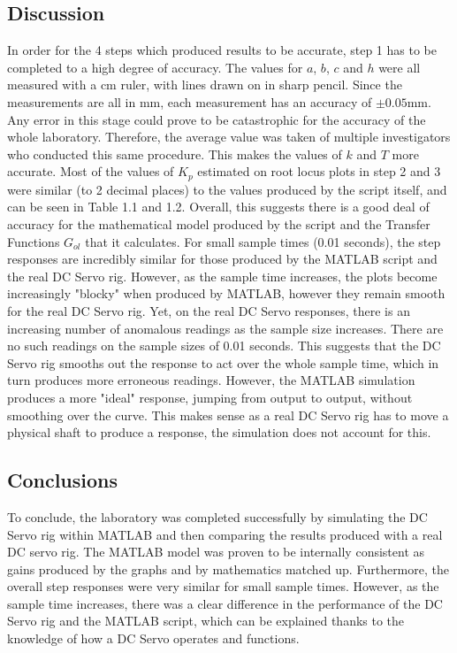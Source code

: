 \documentclass[stu, a4paper, 12pt, floatsintext]{apa7}
\numberwithin{figure}{section}
\numberwithin{table}{section}
\numberwithin{equation}{section}
\begin{document}
\subsection{Discussion}
In order for the 4 steps which produced results to be accurate, step 1 has to be completed to a high degree of accuracy. The values for $a$, $b$, $c$ and $h$ were all measured with a cm ruler, with lines drawn on in sharp pencil. Since the measurements are all in mm, each measurement has an accuracy of $\pm 0.05$mm. Any error in this stage could prove to be catastrophic for the accuracy of the whole laboratory. Therefore, the average value was taken of multiple investigators who conducted this same procedure. This makes the values of $k$ and $T$ more accurate. 
Most of the values of $K_p$ estimated on root locus plots in step 2 and 3 were similar (to 2 decimal places) to the values produced by the script itself, and can be seen in Table 1.1 and 1.2. Overall, this suggests there is a good deal of accuracy for the mathematical model produced by the script and the Transfer Functions $G_{ol}$ that it calculates.
For small sample times (0.01 seconds), the step responses are incredibly similar for those produced by the MATLAB script and the real DC Servo rig. However, as the sample time increases, the plots become increasingly "blocky" when produced by MATLAB, however they remain smooth for the real DC Servo rig. Yet, on the real DC Servo responses, there is an increasing number of anomalous readings as the sample size increases. There are no such readings on the sample sizes of 0.01 seconds. This suggests that the DC Servo rig smooths out the response to act over the whole sample time, which in turn produces more erroneous readings. However, the MATLAB simulation produces a more "ideal" response, jumping from output to output, without smoothing over the curve. This makes sense as a real DC Servo rig has to move a physical shaft to produce a response, the simulation does not account for this.   
\subsection{Conclusions}
To conclude, the laboratory was completed successfully by simulating the DC Servo rig within MATLAB and then comparing the results produced with a real DC servo rig. The MATLAB model was proven to be internally consistent as gains produced by the graphs and by mathematics matched up. Furthermore, the overall step responses were very similar for small sample times. However, as the sample time increases, there was a clear difference in the performance of the DC Servo rig and the MATLAB script, which can be explained thanks to the knowledge of how a DC Servo operates  and functions. 
\newpage
\end{document}
